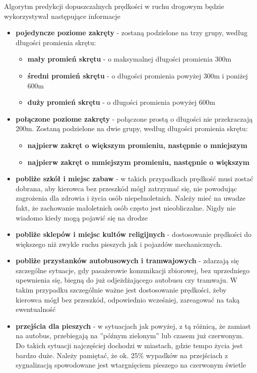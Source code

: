 Algorytm predykcji dopuszczalnych prędkości w ruchu drogowym będzie wykorzystywał następujące informacje

\begin{itemize}
\item \textbf{pojedyncze poziome zakręty} - zostaną podzielone na trzy grupy, według długości promienia skrętu:
 \begin{itemize}
 	\item \textbf{mały promień skrętu} - o maksymalnej długości promienia 300m
 	\item \textbf{średni promień skrętu} - o długości promienia powyżej 300m i poniżej 600m
 	\item \textbf{duży promień skrętu} - o długości promienia powyżej 600m 
 \end{itemize}
\item \textbf{połączone poziome zakręty} - połączone prostą o długości nie przekraczają 200m. Zostaną podzielone na dwie grupy, według długości promienia skrętu:
 \begin{itemize}
 	\item \textbf{najpierw zakręt o większym promieniu, następnie o mniejszym}
 	\item \textbf{najpierw zakręt o mmiejszym promieniu, następnie o większym}
 \end{itemize}
\item \textbf{pobliże szkół i miejsc zabaw} - w takich przypadkach prędkość musi zostać dobrana, aby kierowca bez przeszkód mógł zatrzymać się, nie powodując zagrożenia dla zdrowia i życia osób niepełnoletnich. Należy mieć na uwadze fakt, że zachowanie małoletnich osób często jest nieobliczalne. Nigdy nie wiadomo kiedy mogą pojawić się na drodze
\item \textbf{pobliże sklepów i miejsc kultów religijnych} - dostosowanie prędkości do większego niż zwykle ruchu pieszych jak i pojazdów mechanicznych.
\item \textbf{pobliże przystanków autobusowych i tramwajowych} - zdarzają się szczególne sytuacje, gdy pasażerowie komunikacji zbiorowej, bez uprzedniego upewnienia się, biegną  do już odjeżdżającego autobusu czy tramwaju. W takim przypadku szczególnie ważne jest dostosowanie prędkości, żeby kierowca mógł bez przeszkód, odpowiednio wcześniej, zareagować na taką ewentualność
\newpage
\item \textbf{przejścia dla pieszych} - w sytuacjach jak powyżej, z tą różnicą, że zamiast na autobus, przebiegają na ''późnym zielonym'' lub czasem już czerwonym. Do takich sytuacji najczęściej dochodzi w miastach, gdzie tempo życia jest bardzo duże. Należy pamiętać, że ok. 25\% wypadków na przejściach z sygnalizacją spowodowane jest wtargnięciem pieszego na czerwonym świetle

\end{itemize}
